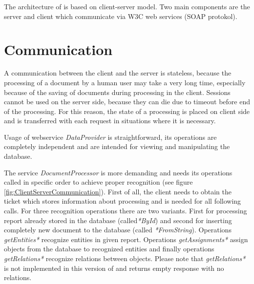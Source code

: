 

The architecture of \textan{} is based on client-server model. Two main components
are the \textan{} server and \textan{} client which communicate via W3C web services
(SOAP protokol).







\section{Communication}
\label{sec:Communication}

A communication between the client and the server is stateless, because the processing
of a document by a human user may take a very long time, especially because of the saving
of documents during processing in the client. Sessions cannot be used on
the server side, because they can die due to timeout before end of the processing.
For this reason, the state of a processing is placed on client side and is transferred
with each request in situations where it is necessary.

Usage of webservice \emph{DataProvider} is straightforward, its operations are
completely independent and are intended for viewing and manipulating
the database.

The service \emph{DocumentProcessor} is more demanding and needs its operations
called in specific order to achieve proper recognition (see figure
\ref{fig:ClientServerCommunication}). First of all, the client needs to obtain
the ticket which stores information about processing and is needed for all
following calls. For three recognition operations there are two variants. First
for processing report already stored in the database (called\emph{*ById}) and
second for inserting completely new document to the database (called
\emph{*FromString}). Operations \emph{getEntities*} recognize entities in
given report. Operations \emph{getAssignments*} assign objects from the database
to recognized entities and finally operations \emph{getRelations*} recognize
relations between objects. Please note that \emph{getRelations*} is not
implemented in this version of \textan{} and returns empty response with no
relations.

